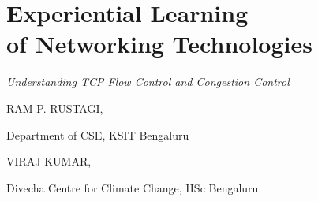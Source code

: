 \chapter{Experiential Learning\\ of Networking Technologies}
\vskip -15pt

\centerline{{\LARGE\sl Understanding TCP Flow Control and Congestion Control}}

\vskip 0.8cm

\begin{center}
{\large\uppercase{Ram P. Rustagi}}, 

\vskip -6pt

Department of CSE, KSIT Bengaluru 


\bigskip
{\large\uppercase{Viraj Kumar,}} 

\vskip -6pt

Divecha Centre for Climate Change, IISc Bengaluru

\end{center}

\vskip 2.3cm



\vfill


\newpage

